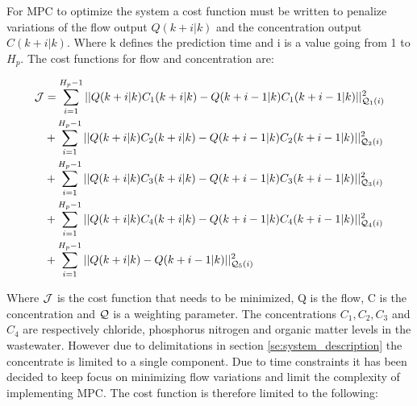 

For MPC to optimize the system a cost function must be written to penalize variations of the flow output $Q(k+i|k)$ and the concentration output $C(k+i|k)$. Where k defines the prediction time and i is a value going from 1 to $H_p$. The cost functions for flow and concentration are:

\begin{equation}
\begin{aligned}
	 \CMcal{J} &= \sum_{i=1}^{H_p-1} || Q(k+i|k)C_1(k+i|k)-Q(k+i-1|k)C_1(k+i-1|k)||_{\CMcal{Q}_1(i)}^2 \\&+\sum_{i=1}^{H_p-1} || Q(k+i|k)C_2(k+i|k)-Q(k+i-1|k)C_2(k+i-1|k)||_{\CMcal{Q}_2(i)}^2 \\&+\sum_{i=1}^{H_p-1} || Q(k+i|k)C_3(k+i|k)-Q(k+i-1|k)C_3(k+i-1|k)||_{\CMcal{Q}_3(i)}^2\\&+\sum_{i=1}^{H_p-1} || Q(k+i|k)C_4(k+i|k)-Q(k+i-1|k)C_4(k+i-1|k)||_{\CMcal{Q}_4(i)}^2 \\& +\sum_{i=1}^{H_p-1} || Q(k+i|k)-Q(k+i-1|k)||_{\CMcal{Q}_5(i)}^2
\end{aligned}	
\end{equation}

Where $\CMcal{J}$ is the cost function that needs to be minimized, Q is the flow, C is the concentration and $\CMcal{Q}$ is a weighting parameter. The concentrations $C_1, C_2, C_3$ and $C_4$ are respectively chloride, phosphorus nitrogen and organic matter levels in the wastewater. 
However due to delimitations in section \ref{se:system_description} the concentrate is limited to a single component.
Due to time constraints it has been decided to keep focus on minimizing flow variations and limit the complexity of implementing MPC. 
The cost function is therefore limited to the following: 

